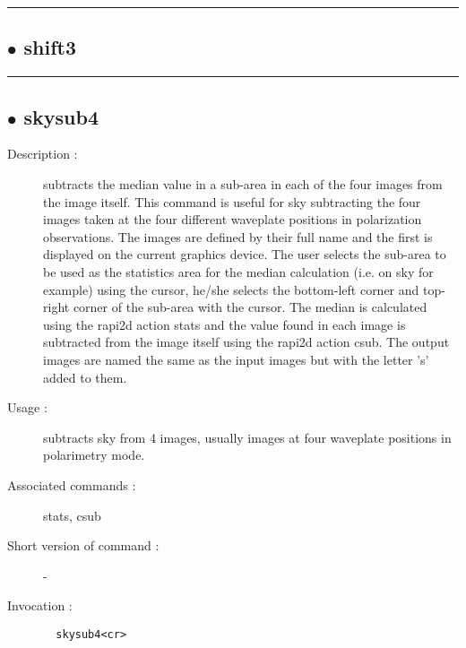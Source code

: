 \hrule \subsection*{$\bullet$ shift3}

\hrule \subsection*{$\bullet$ skysub4}
\begin{description}
\item[Description :] subtracts the median value in a sub-area in each of the four
images from the image itself.  This command is useful for sky subtracting
the four images taken at the four different waveplate positions in
polarization observations.  The images are defined by their full name and
the first is displayed on the current graphics device.  The user selects
the sub-area to be used as the statistics area for the median calculation
(i.e. on sky for example) using the cursor, he/she selects the
bottom-left corner and top-right corner of the sub-area with the cursor.
The median is calculated using the rapi2d action stats and the value
found in each image is subtracted from the image itself using the rapi2d
action csub.  The output images are named the same as the input images
but with the letter 's' added to them.
\item[Usage :] subtracts sky from 4 images, usually images at four waveplate
positions in polarimetry mode.
\item[Associated commands :] stats, csub
\item[Short version of command :] -
\item[Invocation :]

\verb+  skysub4<cr> +\end{description}

